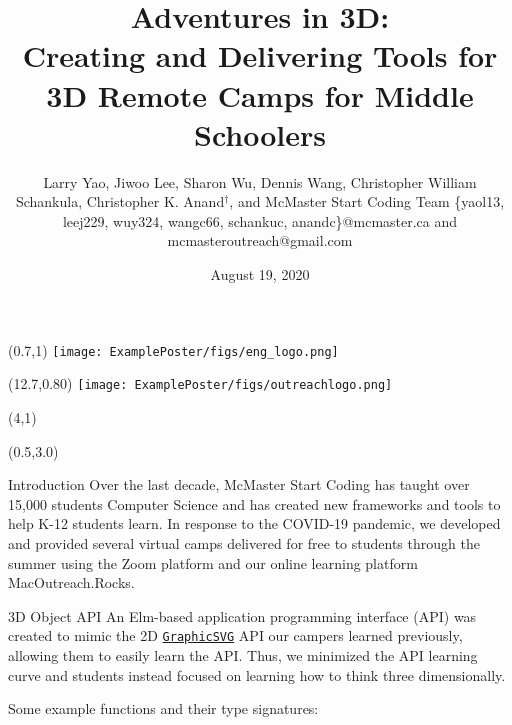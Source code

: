\documentclass[22pt]{beamer}
\title{Adventures in 3D: \\Creating and Delivering Tools for 3D Remote Camps for Middle Schoolers}
\subtitle{}  %
\author[Yao, Lee, Wu, Wang, Schankula, \& Anand]
      {Larry Yao, Jiwoo Lee, Sharon Wu, Dennis Wang, Christopher William Schankula, 
      Christopher K. Anand${}^\dagger$, and McMaster Start Coding Team \newline \small \{yaol13, leej229, wuy324, wangc66, schankuc, anandc\}@mcmaster.ca and mcmasteroutreach@gmail.com}
\institute[McMaster University]{$^\dagger$Department of Computing and Software, McMaster University \quad \texttt{http://outreach.mcmaster.ca}}
\date{August 19, 2020}
\begin{document}

\begin{frame}[fragile]

\begin{textblock}{2}(0.7,1)
\texttt{[image: ExamplePoster/figs/eng\_logo.png]} %
\end{textblock}

\begin{textblock}{2}(12.7,0.80)
\texttt{[image: ExamplePoster/figs/outreachlogo.png]}
\end{textblock}

\begin{textblock}{8}(4,1)
\titlepage
\end{textblock}

\begin{textblock}{7.25}(0.5,3.0)

\begin{block}{Introduction}
Over the last decade, McMaster Start Coding has taught over 15,000 students Computer Science and has created new frameworks and tools to help K-12 students learn.  In response to the COVID-19 pandemic, we developed and provided several virtual camps delivered for free to students through the summer using the Zoom platform and our online learning platform MacOutreach.Rocks.

\end{block}

\begin{block}{3D Object API}
An Elm-based application programming interface (API) was created to mimic the 2D 
\href{https://package.elm-lang.org/packages/MacCASOutreach/graphicsvg/latest/GraphicSVG}
{\texttt{GraphicSVG}} API our campers learned previously, allowing them to easily learn the API. Thus, 
we minimized the API learning curve and students instead focused on learning how to think three dimensionally. 

Some example functions and their type signatures:


\end{block}
\end{textblock}
\end{frame}
\end{document}
